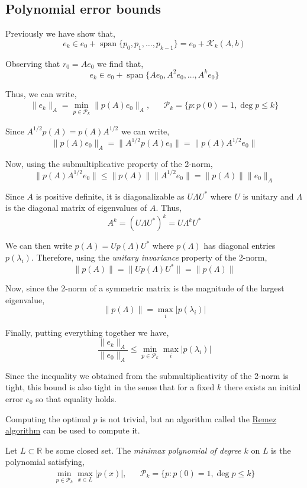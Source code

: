 \hypertarget{polynomial-error-bounds}{%
\subsection{Polynomial error bounds}\label{polynomial-error-bounds}}

Previously we have show that, \[
e_k \in e_0 +  \operatorname{span}\{p_0,p_1,\ldots,p_{k-1}\} = e_0 + \mathcal{K}_k(A,b)
\]

Observing that \(r_0 = Ae_0\) we find that, \[
e_k \in e_0 +  \operatorname{span}\{Ae_0,A^2e_0,\ldots,A^{k}e_0\}
\]

Thus, we can write, \begin{align*}
\| e_k \|_A =  \min_{p\in\mathcal{P}_k}\|p(A)e_0\|_A
,&&
\mathcal{P}_k = \{p : p(0) = 1, \operatorname{deg} p \leq k\}    
\end{align*}

Since \(A^{1/2} p(A) = p(A)A^{1/2}\) we can write, \[
\| p(A)e_0 \|_A
= \|A^{1/2} p(A)e_0 \|
= \|p(A) A^{1/2}e_0 \|
\]

Now, using the submultiplicative property of the 2-norm, \[
\|p(A) A^{1/2}e_0 \|
\leq \|p(A)\| \|A^{1/2} e_0 \|
= \|p(A)\| \|e_0\|_A
\]

Since \(A\) is positive definite, it is diagonalizable as
\(U\Lambda U^*\) where \(U\) is unitary and \(\Lambda\) is the diagonal
matrix of eigenvalues of \(A\). Thus, \[
A^k = (U\Lambda U^*)^k = U\Lambda^kU^*
\]

We can then write \(p(A) = Up(\Lambda)U^*\) where \(p(\Lambda)\) has
diagonal entries \(p(\lambda_i)\). Therefore, using the \emph{unitary
invariance} property of the 2-norm, \[
\|p(A)\| = \|Up(\Lambda)U^*\| = \|p(\Lambda)\|
\]

Now, since the 2-norm of a symmetric matrix is the magnitude of the
largest eigenvalue, \[
\| p(\Lambda) \| = \max_i |p(\lambda_i)|
\]

Finally, putting everything together we have, \[
\frac{\|e_k\|_A}{\|e_0\|_A} \leq \min_{p\in\mathcal{P}_k} \max_i |p(\lambda_i)|
\]

Since the inequality we obtained from the submultiplicativity of the
2-norm is tight, this bound is also tight in the sense that for a fixed
\(k\) there exists an initial error \(e_0\) so that equality holds.

Computing the optimal \(p\) is not trivial, but an algorithm called the
\href{./remez.html}{Remez algorithm} can be used to compute it.

Let \(L\subset \mathbb{R}\) be some closed set. The \emph{minimax
polynomial of degree \(k\)} on \(L\) is the polynomial satisfying,
\begin{align*}
\min_{p\in\mathcal{P}_k} \max_{x\in L} | p(x) |
,&&
\mathcal{P}_k = \{p : p(0)=1, \deg p \leq k\}    
\end{align*}


